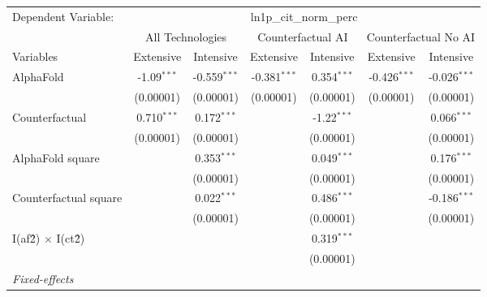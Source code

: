 \begingroup
\centering
\begin{tabular}{lcccccc}
   \tabularnewline \midrule \midrule
   Dependent Variable: & \multicolumn{6}{c}{ln1p\_cit\_norm\_perc}\\
 & \multicolumn{2}{c}{All Technologies} & \multicolumn{2}{c}{Counterfactual AI} & \multicolumn{2}{c}{Counterfactual No AI} \\
\cmidrule(lr){1-1}\cmidrule(lr){2-3} \cmidrule(lr){4-5} \cmidrule(lr){6-7}
Variables & \multicolumn{1}{c}{Extensive} & \multicolumn{1}{c}{Intensive} & \multicolumn{1}{c}{Extensive} & \multicolumn{1}{c}{Intensive} & \multicolumn{1}{c}{Extensive} & \multicolumn{1}{c}{Intensive} \\
\cmidrule(lr){1-1}\cmidrule(lr){2-2} \cmidrule(lr){3-3} \cmidrule(lr){4-4} \cmidrule(lr){5-5} \cmidrule(lr){6-6} \cmidrule(lr){7-7}
   AlphaFold                     & -1.09$^{***}$ & -0.559$^{***}$ & -0.381$^{***}$ & 0.354$^{***}$ & -0.426$^{***}$ & -0.026$^{***}$\\   
                                 & (0.00001)     & (0.00001)      & (0.00001)      & (0.00001)     & (0.00001)      & (0.00001)\\   
   Counterfactual                & 0.710$^{***}$ & 0.172$^{***}$  &                & -1.22$^{***}$ &                & 0.066$^{***}$\\   
                                 & (0.00001)     & (0.00001)      &                & (0.00001)     &                & (0.00001)\\   
   AlphaFold square              &               & 0.353$^{***}$  &                & 0.049$^{***}$ &                & 0.176$^{***}$\\   
                                 &               & (0.00001)      &                & (0.00001)     &                & (0.00001)\\   
   Counterfactual square         &               & 0.022$^{***}$  &                & 0.486$^{***}$ &                & -0.186$^{***}$\\   
                                 &               & (0.00001)      &                & (0.00001)     &                & (0.00001)\\   
   I(af\^2) $\times$ I(ct\^2)    &               &                &                & 0.319$^{***}$ &                &   \\   
                                 &               &                &                & (0.00001)     &                &   \\   
   \midrule
   \emph{Fixed-effects}\\

\end{tabular}

